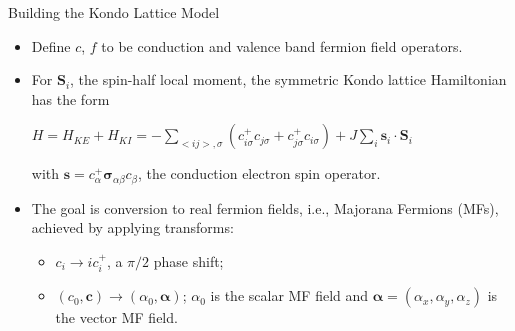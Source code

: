 \documentclass{beamer}
\begin{document}
\begin{frame}{Building the Kondo Lattice Model}
    
    
    \begin{itemize}
        \item Define $c$, $f$ to be conduction and valence band fermion field operators.
        
        \item For $\mathbf{S}_i$, the spin-half local moment, the symmetric Kondo lattice Hamiltonian has the form
        \begin{center}
            $H = H_{KE} + H_{KI} = -\sum_{<ij>, \sigma} (c_{i\sigma}^+c_{j\sigma} + c_{j\sigma}^+c_{i\sigma}) + J\sum_i \mathbf{s}_i \cdot \mathbf{S}_i$
        \end{center}
        
        with $\mathbf{s} = c_{\alpha}^+ \boldsymbol\sigma_{\alpha \beta}c_{\beta}$, the conduction electron spin operator.
        
        \item The goal is conversion to real fermion fields, i.e., Majorana Fermions (MFs), achieved by applying transforms:
        \begin{itemize}
            \item $c_i \to ic_i^+$, a $\pi/2$ phase shift;
            
            \item $(c_0, \textbf{c}) \to (\alpha_0, \boldsymbol\alpha)$; $\alpha_0$ is the scalar MF field and $\boldsymbol\alpha = (\alpha_x, \alpha_y, \alpha_z)$ is the vector MF field.
        \end{itemize}
        
        
    \end{itemize}
    
    
    
    
    
\end{frame}


\end{document}
